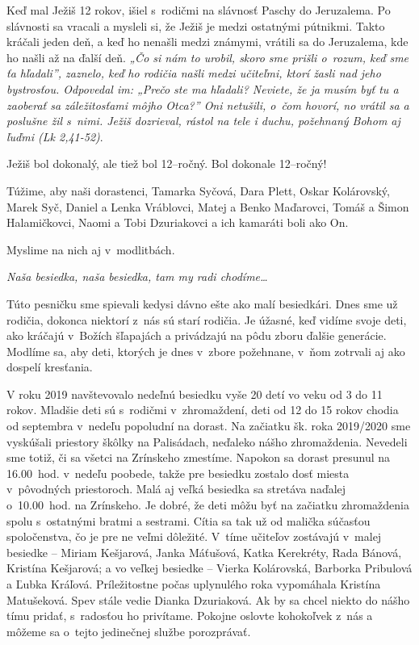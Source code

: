 Keď mal Ježiš 12 rokov, išiel s~rodičmi na slávnosť Paschy do Jeruzalema. Po slávnosti sa vracali a mysleli si, že Ježiš je medzi ostatnými pútnikmi. Takto kráčali jeden deň, a keď ho nenašli medzi známymi, vrátili sa do Jeruzalema, kde ho našli až na ďalší deň. {\it „Čo si nám to urobil, skoro sme prišli o~rozum, keď sme ťa hľadali”, zaznelo, keď ho rodičia našli medzi učiteľmi, ktorí žasli nad jeho bystrosťou. Odpovedal im: „Prečo ste ma hľadali? Neviete, že ja musím byť tu a zaoberať sa záležitosťami môjho Otca?” Oni netušili, o~čom hovorí, no vrátil sa a poslušne žil s~nimi. Ježiš dozrieval, rástol na tele i duchu, požehnaný Bohom aj ľuďmi {\em (Lk 2,41-52)}}.

Ježiš bol dokonalý, ale tiež bol 12--ročný. Bol dokonale 12--ročný!

Túžime, aby naši dorastenci, Tamarka Syčová, Dara Plett, Oskar Kolárovský, Marek Syč,  Daniel a Lenka Vráblovci, Matej a Benko Maďarovci, Tomáš a Šimon Halamičkovci, Naomi a Tobi Dzuriakovci a ich kamaráti boli ako On.

Myslime na nich aj v~modlitbách.



{\it Naša besiedka, naša besiedka, tam my radi chodíme…}

Túto pesničku sme spievali kedysi dávno ešte ako malí besiedkári. Dnes sme už rodičia, dokonca niektorí z~nás sú starí rodičia. Je úžasné, keď vidíme svoje deti, ako kráčajú v~Božích šľapajách a privádzajú na pôdu zboru ďalšie generácie. Modlíme sa, aby deti, ktorých je dnes v~zbore požehnane, v~ňom zotrvali aj ako dospelí kresťania.

V roku 2019 navštevovalo nedeľnú besiedku vyše 20 detí vo veku od 3 do 11 rokov. Mladšie deti sú s~rodičmi v~zhromaždení, deti od 12 do 15 rokov chodia od septembra v~nedeľu popoludní na dorast.  Na začiatku šk. roka 2019/2020 sme vyskúšali priestory škôlky na Palisádach, neďaleko nášho zhromaždenia. Nevedeli sme totiž, či sa všetci na Zrínskeho zmestíme. Napokon sa dorast presunul na 16.00~hod. v~nedeľu poobede, takže pre besiedku zostalo dosť miesta v~pôvodných priestoroch. Malá aj veľká besiedka sa stretáva naďalej o~10.00~hod. na Zrínskeho. Je dobré, že deti môžu byť na začiatku zhromaždenia spolu s~ostatnými bratmi a sestrami. Cítia sa tak už od malička súčasťou spoločenstva, čo je pre ne veľmi dôležité. V~tíme učiteľov zostávajú v~malej besiedke -- Miriam Kešjarová, Janka Máťušová, Katka Kerekréty, Rada Bánová, Kristína Kešjarová; a vo veľkej besiedke -- Vierka Kolárovská, Barborka Pribulová a Ľubka Kráľová. Príležitostne počas uplynulého roka vypomáhala Kristína Matušeková. Spev stále vedie Dianka Dzuriaková. Ak by sa chcel niekto do nášho tímu pridať, s~radosťou ho privítame. Pokojne oslovte kohokoľvek z~nás a môžeme sa o~tejto jedinečnej službe porozprávať.

